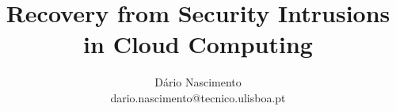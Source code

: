 \documentclass{llncs}
\begin{document}
\mainmatter              %
\title{Recovery from Security Intrusions in Cloud Computing}
\author{
	Dário Nascimento\\
	dario.nascimento@tecnico.ulisboa.pt \\
}


\maketitle

\begin{abstract}


\end{abstract}















\clearpage

\clearpage


\end{document}
